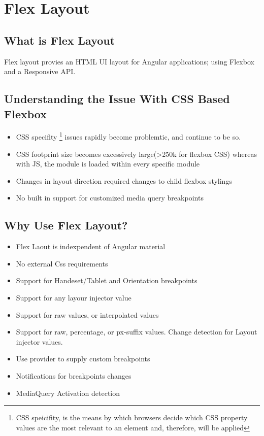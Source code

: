 \maketitle{}
\section{ Flex Layout }


\subsection{ What is Flex Layout }
Flex layout provies an HTML UI layout for Angular applications; using Flexbox
and a Responsive API.

\subsection{ Understanding the Issue With CSS Based Flexbox }
\begin{itemize}
  \item CSS specifity \footnote{CSS speicifity, is the means by which browsers
  decide which CSS property values are the most relevant to an element and,
  therefore, will be applied} issues rapidly become problemtic, and continue
  to be so.
  \item CSS footprint size becomes excessively large(>250k for flexbox CSS)
  whereas with JS, the module is loaded within every specific module
  \item Changes in layout direction required changes to child flexbox stylings
  \item No built in support for customized media query breakpoints 
\end{itemize}

\subsection{ Why Use Flex Layout? }
\begin{itemize}
  \item Flex Laout is indexpendent of Angular material
  \item No external Css requirements
  \item Support for Handeset/Tablet and Orientation breakpoints
  \item Support for any layour injector value
  \item Support for raw values, or interpolated values
  \item Support for raw, percentage, or px-suffix values. Change detection
  for Layout injector values.
  \item Use provider to supply custom breakpoints
  \item Notifications for breakpoints changes
  \item MediaQuery Activation detection
\end{itemize}


